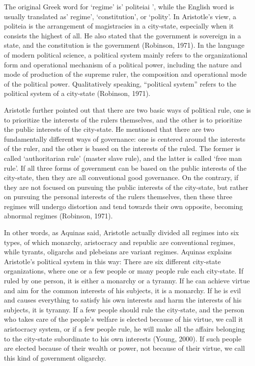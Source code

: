 \documentclass[11pt]{article}
\begin{document}
The original Greek word for ‘regime' is' politeiai ', while the English word is usually translated as' regime', ‘constitution', or ‘polity'. In Aristotle's view, a politeia is the arrangement of magistracies in a city-state, especially when it consists the highest of all. He also stated that the government is sovereign in a state, and the constitution is the government (Robinson, 1971). In the language of modern political science, a political system mainly refers to the organizational form and operational mechanism of a political power, including the nature and mode of production of the supreme ruler, the composition and operational mode of the political power. Qualitatively speaking, “political system” refers to the political system of a city-state (Robinson, 1971).

Aristotle further pointed out that there are two basic ways of political rule, one is to prioritize the interests of the rulers themselves, and the other is to prioritize the public interests of the city-state. He mentioned that there are two fundamentally different ways of governance: one is centered around the interests of the ruler, and the other is based on the interests of the ruled. The former is called ‘authoritarian rule' (master slave rule), and the latter is called ‘free man rule'. If all three forms of government can be based on the public interests of the city-state, then they are all conventional good governance. On the contrary, if they are not focused on pursuing the public interests of the city-state, but rather on pursuing the personal interests of the rulers themselves, then these three regimes will undergo distortion and tend towards their own opposite, becoming abnormal regimes (Robinson, 1971).

In other words, as Aquinas said, Aristotle actually divided all regimes into six types, of which monarchy, aristocracy and republic are conventional regimes, while tyrants, oligarchs and plebeians are variant regimes. Aquinas explains Aristotle's political system in this way: There are six different city-state organizations, where one or a few people or many people rule each city-state. If ruled by one person, it is either a monarchy or a tyranny. If he can achieve virtue and aim for the common interests of his subjects, it is a monarchy. If he is evil and causes everything to satisfy his own interests and harm the interests of his subjects, it is tyranny. If a few people should rule the city-state, and the person who takes care of the people's welfare is elected because of his virtue, we call it aristocracy system, or if a few people rule, he will make all the affairs belonging to the city-state subordinate to his own interests (Young, 2000). If such people are elected because of their wealth or power, not because of their virtue, we call this kind of government oligarchy.
\end{document}
